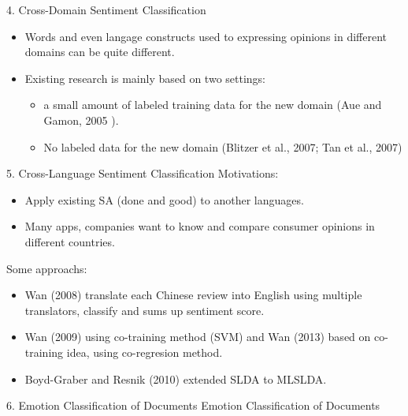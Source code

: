 \documentclass[xcolor=table]{beamer}
\begin{document}
\begin{frame}{4. Cross-Domain Sentiment Classification}
    \begin{itemize}
        \item Words and even langage constructs used to expressing opinions in different domains can be quite different.
        \item Existing research is mainly based on two settings:
        \begin{itemize}
            \item a small amount of labeled training data for the new domain (Aue and Gamon, 2005 \cite{aue2005customizing}).
            \item No labeled data for the new domain (Blitzer et al., 2007\cite{blitzer2007biographies}; Tan et al., 2007\cite{tan2007novel})
        \end{itemize}
    \end{itemize}
\end{frame}

\begin{frame}{5. Cross-Language Sentiment Classification}
    Motivations:
    \begin{itemize}
        \item Apply existing SA (done and good) to another languages.
        \item Many apps, companies want to know and compare consumer opinions in different countries.
    \end{itemize}
    \pause
    
    
    Some approachs:
    \begin{itemize}
        \item Wan (2008)\cite{wan2008using} translate each Chinese review into English using multiple translators, classify and sums up sentiment score.
        
        \item Wan (2009)\cite{wan2009co} using co-training method (SVM) and Wan (2013)\cite{wan2013co} based on co-training idea, using co-regresion method.
        
        \item Boyd-Graber and Resnik (2010)\cite{boyd2010holistic} extended SLDA to MLSLDA.
    \end{itemize}
    
\end{frame}

\begin{frame}{6. Emotion Classification of Documents}
    Emotion Classification of Documents
\end{frame}
\end{document}
